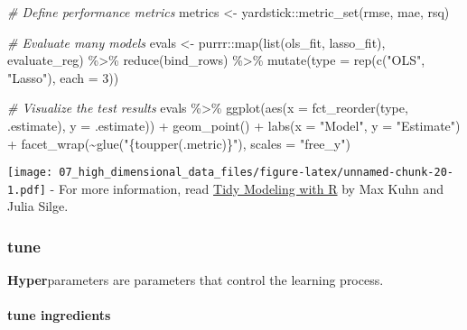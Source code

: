 \documentclass[
]{book}
\newenvironment{Shaded}{\begin{snugshade}}{\end{snugshade}}
\newcommand{\AttributeTok}[1]{\textcolor[rgb]{0.77,0.63,0.00}{#1}}
\newcommand{\CommentTok}[1]{\textcolor[rgb]{0.56,0.35,0.01}{\textit{#1}}}
\newcommand{\DecValTok}[1]{\textcolor[rgb]{0.00,0.00,0.81}{#1}}
\newcommand{\FunctionTok}[1]{\textcolor[rgb]{0.00,0.00,0.00}{#1}}
\newcommand{\NormalTok}[1]{#1}
\newcommand{\OtherTok}[1]{\textcolor[rgb]{0.56,0.35,0.01}{#1}}
\newcommand{\SpecialCharTok}[1]{\textcolor[rgb]{0.00,0.00,0.00}{#1}}
\newcommand{\StringTok}[1]{\textcolor[rgb]{0.31,0.60,0.02}{#1}}
\begin{document}
\begin{Shaded}
\begin{Highlighting}[]
\CommentTok{\# Define performance metrics }
\NormalTok{metrics }\OtherTok{\textless{}{-}}\NormalTok{ yardstick}\SpecialCharTok{::}\FunctionTok{metric\_set}\NormalTok{(rmse, mae, rsq)}

\CommentTok{\# Evaluate many models }
\NormalTok{evals }\OtherTok{\textless{}{-}}\NormalTok{ purrr}\SpecialCharTok{::}\FunctionTok{map}\NormalTok{(}\FunctionTok{list}\NormalTok{(ols\_fit, lasso\_fit), evaluate\_reg) }\SpecialCharTok{\%\textgreater{}\%}
  \FunctionTok{reduce}\NormalTok{(bind\_rows) }\SpecialCharTok{\%\textgreater{}\%}
  \FunctionTok{mutate}\NormalTok{(}\AttributeTok{type =} \FunctionTok{rep}\NormalTok{(}\FunctionTok{c}\NormalTok{(}\StringTok{"OLS"}\NormalTok{, }\StringTok{"Lasso"}\NormalTok{), }\AttributeTok{each =} \DecValTok{3}\NormalTok{))}

\CommentTok{\# Visualize the test results }
\NormalTok{evals }\SpecialCharTok{\%\textgreater{}\%}
  \FunctionTok{ggplot}\NormalTok{(}\FunctionTok{aes}\NormalTok{(}\AttributeTok{x =} \FunctionTok{fct\_reorder}\NormalTok{(type, .estimate), }\AttributeTok{y =}\NormalTok{ .estimate)) }\SpecialCharTok{+}
    \FunctionTok{geom\_point}\NormalTok{() }\SpecialCharTok{+}
    \FunctionTok{labs}\NormalTok{(}\AttributeTok{x =} \StringTok{"Model"}\NormalTok{,}
         \AttributeTok{y =} \StringTok{"Estimate"}\NormalTok{) }\SpecialCharTok{+}
    \FunctionTok{facet\_wrap}\NormalTok{(}\SpecialCharTok{\textasciitilde{}}\FunctionTok{glue}\NormalTok{(}\StringTok{"\{toupper(.metric)\}"}\NormalTok{), }\AttributeTok{scales =} \StringTok{"free\_y"}\NormalTok{) }
\end{Highlighting}
\end{Shaded}

\texttt{[image: 07\_high\_dimensional\_data\_files/figure-latex/unnamed-chunk-20-1.pdf]}
- For more information, read \href{https://www.tmwr.org/}{Tidy Modeling with R} by Max Kuhn and Julia Silge.

\hypertarget{tune}{%
\subsubsection{tune}\label{tune}}

\textbf{Hyper}parameters are parameters that control the learning process.

\hypertarget{tune-ingredients}{%
\paragraph{tune ingredients}\label{tune-ingredients}}
\end{document}

